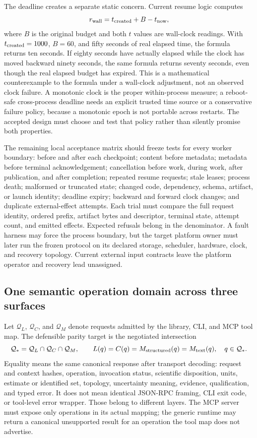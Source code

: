 The deadline creates a separate static concern. Current resume logic computes
\[
 r_{\rm wall}=t_{\rm created}+B-t_{\rm now},
\]
where $B$ is the original budget and both $t$ values are wall-clock readings.
With $t_{\rm created}=1000$, $B=60$, and fifty seconds of real elapsed time,
the formula returns ten seconds. If eighty seconds have actually elapsed while
the clock has moved backward ninety seconds, the same formula returns seventy
seconds, even though the real elapsed budget has expired. This is a
mathematical counterexample to the formula under a wall-clock adjustment, not
an observed clock failure. A monotonic clock is the proper within-process
measure; a reboot-safe cross-process deadline needs an explicit trusted time
source or a conservative failure policy, because a monotonic epoch is not
portable across restarts. The accepted design must choose and test that
policy rather than silently promise both properties.
\citep{exec14_failure_implementation,exec17_continuity_reference}

The remaining local acceptance matrix should freeze tests for every worker
boundary: before and after each checkpoint; content before metadata; metadata
before terminal acknowledgement; cancellation before work, during work,
after publication, and after completion; repeated resume requests; stale
leases; process death; malformed or truncated state; changed code, dependency,
schema, artifact, or launch identity; deadline expiry; backward and forward
clock changes; and duplicate external-effect attempts. Each trial must compare
the full request identity, ordered prefix, artifact bytes and descriptor,
terminal state, attempt count, and emitted effects. Expected refusals belong in
the denominator. A fault harness may force the process boundary, but the
target platform owner must later run the frozen protocol on its declared
storage, scheduler, hardware, clock, and recovery topology. Current external
input contracts leave the platform operator and recovery lead unassigned.
\citep{exec17_continuity_contract}

\subsection{One semantic operation domain across three surfaces}
\label{exec17:shared-operation}

Let $\mathcal Q_L$, $\mathcal Q_C$, and $\mathcal Q_M$ denote requests admitted
by the library, CLI, and MCP tool map. The defensible parity target is the
negotiated intersection
\[
 \mathcal Q_* = \mathcal Q_L\cap\mathcal Q_C\cap\mathcal Q_M,
 \qquad
 L(q)=C(q)=M_{\rm structured}(q)=M_{\rm text}(q),\quad q\in\mathcal Q_*.
\]
Equality means the same canonical response after transport decoding: request
and context hashes, operation, invocation status, scientific disposition,
units, estimate or identified set, topology, uncertainty meaning, evidence,
qualification, and typed error. It does not mean identical JSON-RPC framing,
CLI exit code, or tool-level error wrapper. Those belong to different layers.
The MCP server must expose only operations in its actual mapping; the generic
runtime may return a canonical unsupported result for an operation the tool
map does not advertise.\citep{exec16_parity_design,exec16_parity_observed}

